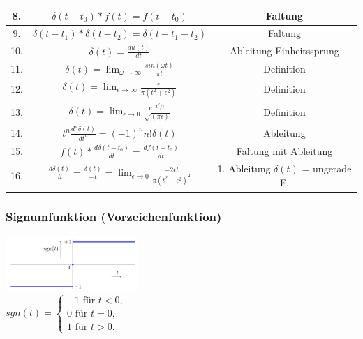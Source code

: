 \begin{multicols}{2}
{\begin{tabular}{ccc}
      \hline
      8.  & $\delta(t-t_0) * f(t) = f(t-t_0)$                                                                                    & Faltung                                \\
      \hline \rowcolor{TabularBackgroundColor}
      9.  & $\delta(t-t_1) * \delta(t-t_2) = \delta(t-t_1-t_2)$                                                                  & Faltung                                \\
      \hline
      10. & $\delta(t) = \frac{du(t)}{dt}$                                                                                       & Ableitung Einheitssprung               \\
      \hline \rowcolor{TabularBackgroundColor}
      11. & $ \delta(t) = \lim _{\omega \to \infty} \frac{sin(\omega t)}{\pi t} $                                                & Definition                             \\
      \hline
      12. & $ \delta(t) = \lim _{\epsilon \to \infty} \frac{\epsilon}{\pi(t^2 + \epsilon^2)} $                                   & Definition                             \\
      \hline \rowcolor{TabularBackgroundColor}
      13. & $\delta(t) = \lim _{\epsilon \to 0} \frac{e^{-t^2/\epsilon}}{\sqrt{(\pi \epsilon)}} $                                & Definition                             \\
      \hline
      14. & $t^n \frac{d^n \delta(t)}{dt^n} = (-1)^n n! \delta(t)$                                                               & Ableitung                              \\
      \hline \rowcolor{TabularBackgroundColor}
      15. & $f(t) * \frac{d\delta(t-t_0)}{dt} = \frac{df(t-t_0)}{dt}$                                                            & Faltung mit Ableitung                  \\
      \hline
      16. & $\frac{d\delta(t)}{dt} = \frac{\delta(t)}{-t} = \lim _{\epsilon \to 0} \frac{-2\epsilon t}{\pi(t^2 + \epsilon^2)^2}$ & 1. Ableitung $\delta(t)$ = ungerade F. \\
      \hline
    \end{tabular}}
  \subsubsection*{Signumfunktion (Vorzeichenfunktion)}
  \includegraphics[width = 5cm]{include/Wichtige Funktionen/img/Signumfunktion.png}
  \footnotesize
  \\ $sgn(t) = \begin{cases}
      -1 \textrm{ für }  t<0,  \\
      0 \textrm{ für }  t = 0, \\
      1 \textrm{ für }  t >0.
    \end{cases}   $                                                          \\

\end{multicols}
